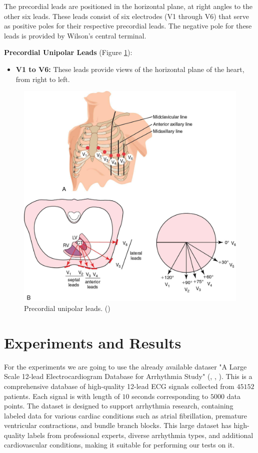 \documentclass{mldsmsc}
\begin{document}
\noindent The precordial leads are positioned in the horizontal plane, at right angles to the other six leads. These leads consist of six electrodes (V1 through V6) that serve as positive poles for their respective precordial leads. The negative pole for these leads is provided by Wilson's central terminal. \newline

\noindent \textbf{Precordial Unipolar Leads} (Figure \ref{fig:vs}):
\begin{itemize}
    \item \textbf{V1 to V6:} These leads provide views of the horizontal plane of the heart, from right to left.
\end{itemize}

\begin{figure}[h!]
\centering
\includegraphics[width=0.5\linewidth]{images/vs.jpg}
\caption{Precordial unipolar leads. (\cite{huszar})}
\label{fig:vs}
\end{figure}

\clearpage

\chapter{Experiments and Results} \label{ch:3}

For the experiments we are going to use the already available dataser "A Large Scale 12-lead Electrocardiogram Database for Arrhythmia Study" (\cite{cite1}, \cite{cite2}, \cite{cite3}). This is a comprehensive database of high-quality 12-lead ECG signals collected from $45 152$ patients. Each signal is with length of $10$ seconds corresponding to $5 000$ data points. The dataset is designed to support arrhythmia research, containing labeled data for various cardiac conditions such as atrial fibrillation, premature ventricular contractions, and bundle branch blocks. This large dataset has high-quality labels from professional experts, diverse arrhythmia types, and additional cardiovascular conditions, making it suitable for performing our tests on it. \newline
\end{document}
